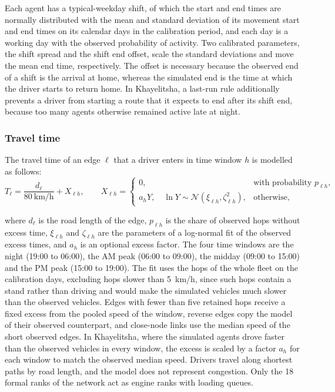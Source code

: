 Each agent has a typical-weekday shift, of which the start and end times are normally distributed with the mean and standard deviation of its movement start and end times on its calendar days in the calibration period, and each day is a working day with the observed probability of activity. Two calibrated parameters, the shift spread and the shift end offset, scale the standard deviations and move the mean end time, respectively. The offset is necessary because the observed end of a shift is the arrival at home, whereas the simulated end is the time at which the driver starts to return home. In Khayelitsha, a last-run rule additionally prevents a driver from starting a route that it expects to end after its shift end, because too many agents otherwise remained active late at night.

\subsubsection{Travel time}
\label{app:abm_travel}

The travel time of an edge \( \ell \) that a driver enters in time window \( h \) is modelled as follows:
\begin{equation}
    T_\ell = \frac{d_\ell}{80\ \text{km/h}} + X_{\ell h}, \qquad
    X_{\ell h} =
    \begin{cases}
        0, & \text{with probability } p_{\ell h}, \\
        a_h Y, \quad \ln Y \sim \mathcal{N}\left(\xi_{\ell h}, \zeta_{\ell h}^2\right), & \text{otherwise},
    \end{cases}
\end{equation}

\noindent where \( d_\ell \) is the road length of the edge, \( p_{\ell h} \) is the share of observed hops without excess time, \( \xi_{\ell h} \) and \( \zeta_{\ell h} \) are the parameters of a log-normal fit of the observed excess times, and \( a_h \) is an optional excess factor. The four time windows are the night (19:00 to 06:00), the AM peak (06:00 to 09:00), the midday (09:00 to 15:00) and the PM peak (15:00 to 19:00). The fit uses the hops of the whole fleet on the calibration days, excluding hops slower than 5~km/h, since such hops contain a stand rather than driving and would make the simulated vehicles much slower than the observed vehicles. Edges with fewer than five retained hops receive a fixed excess from the pooled speed of the window, reverse edges copy the model of their observed counterpart, and close-node links use the median speed of the short observed edges. In Khayelitsha, where the simulated agents drove faster than the observed vehicles in every window, the excess is scaled by a factor \( a_h \) for each window to match the observed median speed. Drivers travel along shortest paths by road length, and the model does not represent congestion. Only the 18 formal ranks of the network act as engine ranks with loading queues.

